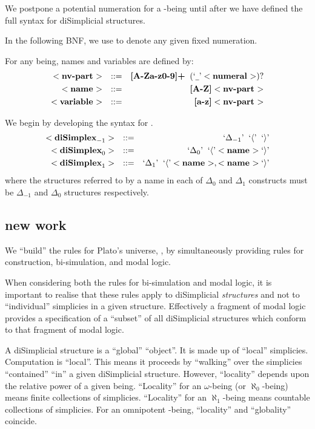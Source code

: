 \documentclass[a4paper,openany]{amsbook}
\begin{document}
We postpone a potential numeration for a \Cardinal-being until after we have
defined the full syntax for diSimplicial structures.

In the following BNF, we use  to denote any given fixed
numeration.

For any being, names and variables are defined by:
%
\begin{align*}
%
\bnf{nv-part}{} \quad & \bnfAssign & 
  \textbf{[A-Za-z0-9]+} \;\; ( \bnfT{\underline{\hspace{1ex} }} \bnf{numeral}{} )\text{?} \\
%
\bnf{name}{} \quad & \bnfAssign & \textbf{[A-Z]} \bnf{nv-part}{} \\
%
\bnf{variable}{} \quad & \bnfAssign & \textbf{[a-z]} \bnf{nv-part}{}
%
\end{align*}

We begin by developing the syntax for .
%
\begin{align*}
%
\bnf{diSimplex}{-1} \quad & \bnfAssign & \bnfT{\Delta_{-1}} \;\; \bnfT{\langle} \;\; \bnfT{\rangle} \\
%
\bnf{diSimplex}{0} \quad & \bnfAssign & \bnfT{\Delta_0} \;\; \bnfT{\langle} \bnf{name}{} \bnfT{\rangle} \\
%
\bnf{diSimplex}{1} \quad & \bnfAssign & 
  \bnfT{\Delta_1} \;\; \bnfT{\langle} \bnf{name}{}, \bnf{name}{} \bnfT{\rangle}
%
\end{align*}
%
where the structures referred to by a name in each of $\Delta_0$ and $\Delta_1$
constructs must be $\Delta_{-1}$ and $\Delta_0$ structures respectively.

\subsection{new work}

We ``build'' the rules for Plato's universe, \Universe{}{}, by simultaneously providing rules
for construction, bi-simulation, and modal logic.

When considering both the rules for bi-simulation and modal logic, it is important to
realise that these rules apply to diSimplicial \emph{structures} and not to ``individual''
simplicies in a given structure. Effectively a fragment of modal logic provides a
specification of a ``subset'' of all diSimplicial structures which conform to that
fragment of modal logic.

A diSimplicial structure is a ``global'' ``object''.  It is made up of ``local'' simplicies. 
Computation is ``local''. This means it proceeds by ``walking'' over the simplicies 
``contained'' ``in'' a given diSimplicial structure. However, ``locality'' depends upon the 
relative power of a given being. ``Locality'' for an $\omega$-being (or $\aleph_0$-being) 
means finite collections of simplicies. ``Locality'' for an $\aleph_1$-being means countable 
collections of simplicies. For an omnipotent \Cardinal-being, ``locality'' and ``globality'' 
coincide.
\end{document}
